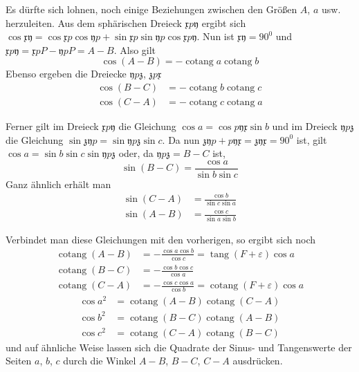 %
Es dürfte sich lohnen, noch einige Beziehungen zwischen den Größen
$A$, $a$ usw. herzuleiten. Aus dem sphärischen Dreieck $\mathfrak{x}p\mathfrak{y}$
ergibt sich $\cos\mathfrak{x}\mathfrak{y}=\cos\mathfrak{x}p\cos\mathfrak{y}p+\sin\mathfrak{x}p\sin\mathfrak{y}p\cos\mathfrak{x}p\mathfrak{y}$.
Nun ist $\mathfrak{x}\mathfrak{y}=90^0$ und
$\mathfrak{x}p\mathfrak{y}=\mathfrak{x}pP-\mathfrak{y}pP=A-B$. Also gilt
\[
\cos(A-B)=-\operatorname{cotang}a\operatorname{cotang}b
\]
Ebenso ergeben die Dreiecke $\mathfrak{y}p\mathfrak{z}$, $\mathfrak{z}p\mathfrak{x}$
\[
\begin{aligned}
\cos(B-C)&=-\operatorname{cotang}b\operatorname{cotang}c\\
\cos(C-A)&=-\operatorname{cotang}c\operatorname{cotang}a
\end{aligned}
\]

Ferner gilt im Dreieck $\mathfrak{x}p\mathfrak{y}$ die Gleichung
$\cos a=\cos p\mathfrak{y}\mathfrak{x}\sin b$ und im Dreieck
$\mathfrak{y}p\mathfrak{z}$ die Gleichung $\sin\mathfrak{z}\mathfrak{y}p=\sin\mathfrak{y}p\mathfrak{z}\sin c$.
Da nun $\mathfrak{z}\mathfrak{y}p+p\mathfrak{y}\mathfrak{x}=\mathfrak{z}\mathfrak{y}\mathfrak{x}=90^0$ ist,
gilt $\cos a=\sin b\sin c\sin\mathfrak{y}p\mathfrak{z}$ oder, da
$\mathfrak{y}p\mathfrak{z}=B-C$ ist,
\[
\sin(B-C)=\frac{\cos a}{\sin b\sin c}
\]
Ganz ähnlich erhält man
\[
\begin{aligned}
\sin(C-A)&=\frac{\cos b}{\sin c\sin a}\\
\sin(A-B)&=\frac{\cos c}{\sin a\sin b}
\end{aligned}
\]

Verbindet man diese Gleichungen mit den vorherigen, so ergibt sich noch
\[
\begin{aligned}
\operatorname{cotang}(A-B)&=-\frac{\cos a\cos b}{\cos c}=\operatorname{tang}(F+\varepsilon)\cos a\\
\operatorname{cotang}(B-C)&=-\frac{\cos b\cos c}{\cos a}\\
\operatorname{cotang}(C-A)&=-\frac{\cos c\cos a}{\cos b}=\operatorname{cotang}(F+\varepsilon)\cos a
\end{aligned}
\]
\[
\begin{aligned}
\cos a^2&=\operatorname{cotang}(A-B)\operatorname{cotang}(C-A)\\
\cos b^2&=\operatorname{cotang}(B-C)\operatorname{cotang}(A-B)\\
\cos c^2&=\operatorname{cotang}(C-A)\operatorname{cotang}(B-C)
\end{aligned}
\]
und auf ähnliche Weise lassen sich die Quadrate der Sinus- und Tangenswerte
der Seiten $a$, $b$, $c$ durch die Winkel $A-B$, $B-C$, $C-A$ ausdrücken.

